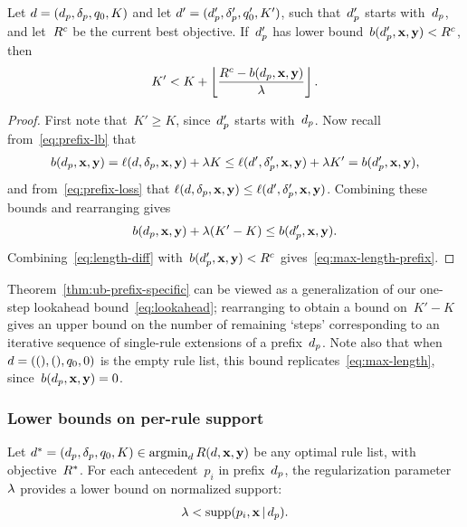 \begin{theorem}
\label{thm:ub-prefix-specific}
Let ${{d} = (d_p, \delta_p, q_0, K)}$
and let ${{d}' = (d_p', \delta_p', q_0', K')}$,
such that~$d_p'$ starts with~$d_p$,
and let~$R^c$ be the current best objective.
%
If~$d_p'$ has lower bound~${b(d_p', \mathbf{x}, \mathbf{y}) < R^c}$, then
\begin{align}
K' < K + \left\lfloor \frac{\CurrentObj - b(\Prefix, \x, \y)}{\Reg} \right\rfloor.
\label{eq:max-length-prefix}
\end{align}
\end{theorem}

\begin{proof}
First note that~${K' \ge K}$, since~$d_p'$ starts with~$d_p$.
%
Now recall from~\eqref{eq:prefix-lb} that
%
\begin{align}
b(\Prefix, \x, \y) = \Loss(\RL, \Labels, \x, \y) + \Reg K
\le \Loss(\RL', \Labels', \x, \y) + \Reg K' = b(\Prefix', \x, \y),
\end{align}
%
and from~\eqref{eq:prefix-loss} that
${\ell({d}, \delta_p, \mathbf{x}, \mathbf{y}) \le \ell({d}', \delta_p', \mathbf{x}, \mathbf{y})}$.
%
Combining these bounds and rearranging gives
\begin{align}
b(\Prefix, \x, \y) + \Reg (K' - K) \le b(\Prefix', \x, \y).
\label{eq:length-diff}
\end{align}
Combining~\eqref{eq:length-diff} with~${b(d_p', \mathbf{x}, \mathbf{y}) < R^c}$
gives~\eqref{eq:max-length-prefix}.
\end{proof}

Theorem~\ref{thm:ub-prefix-specific} can be viewed as a generalization
of our one-step lookahead bound~\eqref{eq:lookahead};
rearranging to obtain a bound on~${K' - K}$
gives an upper bound on the number of remaining `steps' corresponding
to an iterative sequence of single-rule extensions of a prefix~$d_p$.
%
Note also that when~${{d} = ((), (), q_0, 0)}$ is the empty rule list,
this bound replicates~\eqref{eq:max-length}, since~${b(d_p, \mathbf{x}, \mathbf{y}) = 0}$.

\subsubsection{Lower bounds on per-rule support}
\label{sec:lb-support}

\begin{theorem}
Let ${d^* = (d_p, \delta_p, q_0, K) \in \operatorname*{argmin}_{d} R({d}, \mathbf{x}, \mathbf{y})}$
be any optimal rule list, with objective~$R^*$.
%
For each antecedent~$p_i$ in prefix~$d_p$, the regularization
parameter~${\lambda}$ provides a lower bound on normalized support:
\begin{align}
\Reg < \Supp(p_i, \x \given \Prefix).
\label{eq:min-capture}
\end{align}
\end{theorem}


